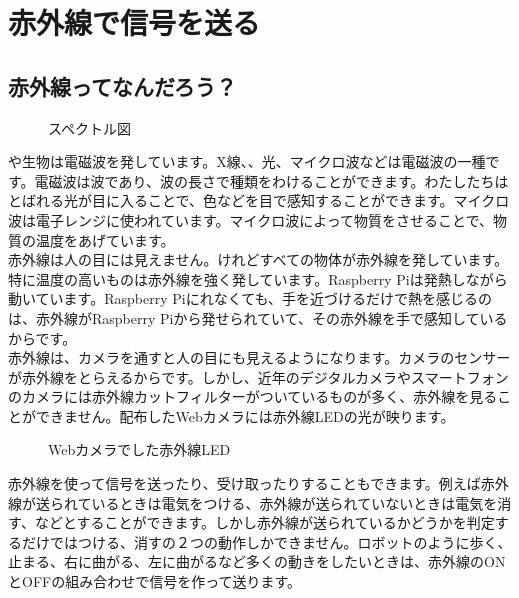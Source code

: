 \documentclass[text05.tex]{subfiles}
\begin{document}
\newpage
\section{赤外線で信号を送る}
\subsection{赤外線ってなんだろう？}

\begin{figure}[H]
\centering

    \caption{スペクトル図}

\end{figure}

や生物は電磁波を発しています。X線、、光、マイクロ波などは電磁波の一種です。電磁波は波であり、波の長さで種類をわけることができます。わたしたちはとばれる光が目に入ることで、色などを目で感知することができます。マイクロ波は電子レンジに使われています。マイクロ波によって物質をさせることで、物質の温度をあげています。\\

赤外線は人の目には見えません。けれどすべての物体が赤外線を発しています。特に温度の高いものは赤外線を強く発しています。Raspberry Piは発熱しながら動いています。Raspberry Piにれなくても、手を近づけるだけで熱を感じるのは、赤外線がRaspberry Piから発せられていて、その赤外線を手で感知しているからです。\\

赤外線は、カメラを通すと人の目にも見えるようになります。カメラのセンサーが赤外線をとらえるからです。しかし、近年のデジタルカメラやスマートフォンのカメラには赤外線カットフィルターがついているものが多く、赤外線を見ることができません。配布したWebカメラには赤外線LEDの光が映ります。

\begin{figure}[H]
    \centering
    
        \caption{Webカメラでした赤外線LED}

\end{figure}

赤外線を使って信号を送ったり、受け取ったりすることもできます。例えば赤外線が送られているときは電気をつける、赤外線が送られていないときは電気を消す、などとすることができます。しかし赤外線が送られているかどうかを判定するだけではつける、消すの２つの動作しかできません。ロボットのように歩く、止まる、右に曲がる、左に曲がるなど多くの動きをしたいときは、赤外線のONとOFFの組み合わせで信号を作って送ります。
\end{document}
